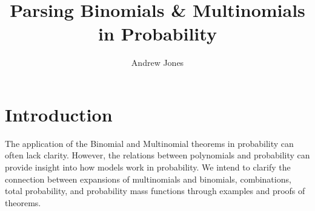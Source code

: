 \documentclass{article}
\title{Parsing Binomials \& Multinomials in Probability}
\author{Andrew Jones}\date{}
\theoremstyle{plain}
\theoremstyle{definition}
\theoremstyle{remark}
\begin{document}
\maketitle



\section*{Introduction}
The application of the Binomial and Multinomial theorems in probability can often lack clarity. However, the relations between polynomials and probability can provide insight into how models work in probability. We intend to clarify the connection between expansions of multinomials and binomials, combinations, total probability, and probability mass functions through examples and proofs of theorems.

\end{document}

